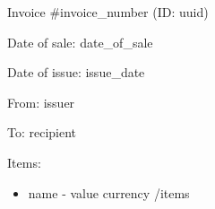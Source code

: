 \documentclass{article}
\begin{document}
  Invoice \#{{invoice_number}} (ID: {{uuid}})

  Date of sale: {{date_of_sale}}

  Date of issue: {{issue_date}}

  From:
  {{issuer}}

  To:
  {{recipient}}

  Items:
  \begin{itemize}
    {{#items}}
    \item{ {{name}} - {{value}} {{currency}} }
    {{/items}}
  \end{itemize}
\end{document}
